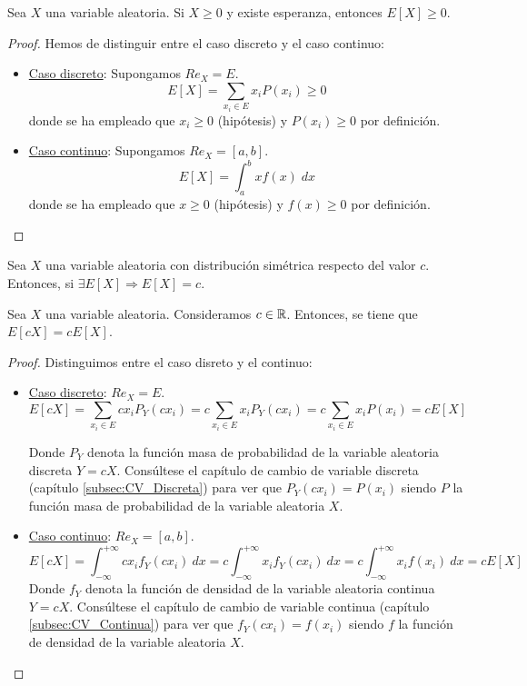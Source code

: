\begin{prop}\label{prop:6.4}
    Sea $X$ una variable aleatoria. Si $X\geq 0$ y existe esperanza, entonces $E[X]\geq 0$.
\end{prop}
\begin{proof}
    Hemos de distinguir entre el caso discreto y el caso continuo:
    \begin{itemize}
        \item \underline{Caso discreto}: Supongamos $Re_X = E$.
        \begin{equation*}
            E[X] = \sum_{x_i\in E} x_iP(x_i) \geq 0
        \end{equation*}
        donde se ha empleado que $x_i\geq 0$ (hipótesis) y $P(x_i)\geq0$ por definición.

        \item \underline{Caso continuo}: Supongamos $Re_X = [a,b]$.
        \begin{equation*}
            E[X] = \int_a^b xf(x)\;dx
        \end{equation*}
        donde se ha empleado que $x\geq 0$ (hipótesis) y $f(x)\geq0$ por definición.
    \end{itemize}
\end{proof}

\begin{prop}
    Sea $X$ una variable aleatoria con distribución simétrica respecto del valor $c$. Entonces, si $\exists E[X]\Longrightarrow E[X]=c$.
\end{prop}

\begin{prop}
    Sea $X$ una variable aleatoria. Consideramos $c \in \mathbb R$. Entonces, se tiene que $E[cX] = cE[X]$.
\end{prop}
\begin{proof}
    Distinguimos entre el caso disreto y el continuo:
    \begin{itemize}
        \item \underline{Caso discreto}: $Re_X = E$.
        $$E[cX] = \sum_{x_i \in E} c x_i P_Y(c x_i) = c \sum_{x_i \in E} x_i P_Y(c  x_i) = c
        \sum_{x_i \in E} x_i P(x_i) = cE[X]$$
        
        Donde $P_Y$ denota la función masa de probabilidad de la variable aleatoria discreta $Y=cX$. Consúltese el capítulo de cambio de variable discreta (capítulo \ref{subsec:CV_Discreta}) para ver que $P_Y(cx_i) = P(x_i)$ siendo $P$ la función masa de probabilidad de la variable aleatoria $X$.

        \item \underline{Caso continuo}: $Re_X = [a,b]$.
        $$E[cX] = \int_{-\infty}^{+\infty} cx_i f_Y(cx_i)~dx = c \int_{-\infty}^{+\infty} x_i f_Y(cx_i)~dx = c \int_{-\infty}^{+\infty} x_i f(x_i)~dx = cE[X]$$
        Donde $f_Y$ denota la función de densidad de la variable aleatoria continua $Y=cX$. Consúltese el capítulo de cambio de variable continua (capítulo \ref{subsec:CV_Continua}) para ver que $f_Y(cx_i) = f(x_i)$ siendo $f$ la función de densidad de la variable aleatoria $X$.
    \end{itemize}
\end{proof}

